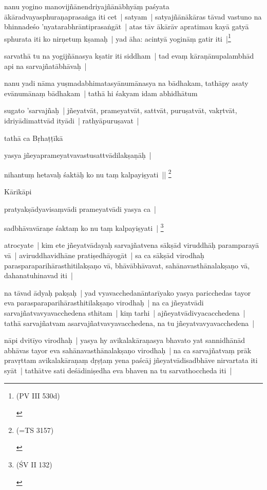 \documentclass[article,12pt,a4paper]{memoir}
\begin{document}
	  \pstart nanu yogino manovijñānendriyajñānābhyāṃ paśyata ākāradvayasphuraṇaprasaṅga iti cet | satyam | satyajñānākāras tāvad vastuno na bhinnadeśo 'nyatarabhrāntiprasaṅgāt | atas tāv ākārāv apratimau kayā gatyā sphurata iti ko nirṇetuṃ kṣamaḥ | yad āha: acintyā yogināṃ gatir iti |\footnote{\begin{english}(PV III 530d)\end{english}}
	\pend
      

	  \pstart sarvathā tu na yogijñānasya kṣatir iti siddham | tad evaṃ kāraṇānupalambhād api na sarvajñatābhāvaḥ | 
	\pend
      

	  \pstart nanu yadi nāma yuṣmadabhimatasyānumānasya na bādhakam, tathāpy asaty evānumānaṃ bādhakam | tathā hi śakyam idam abhidhātum 
	\pend
      

	  \pstart sugato 'sarvajñaḥ | jñeyatvāt, prameyatvāt, sattvāt, puruṣatvāt, vakṛtvāt, idriyādimattvād ityādi | rathyāpuruṣavat | 
	\pend
      

	  \pstart tathā ca Bṛhaṭṭīkā 
	\pend
      

	  \pstart yasya jñeyaprameyatvavastusattvādilakṣaṇāḥ | 
	\pend
      

	  \pstart nihantuṃ hetavaḥ śaktāḥ ko nu taṃ kalpayiṣyati || \footnote{\begin{english}(=TS 3157)\end{english}}
	\pend
      

	  \pstart Kārikāpi 
	\pend
      

	  \pstart pratyakṣādyavisaṃvādi prameyatvādi yasya ca | 
	\pend
      

	  \pstart sadbhāvavāraṇe śaktaṃ ko nu taṃ kalpayiṣyati | \footnote{\begin{english}(ŚV II 132)\end{english}}
	\pend
      

	  \pstart atrocyate | kim ete jñeyatvādayaḥ sarvajñatvena sākṣād viruddhāḥ paramparayā vā | aviruddhavidhāne pratiṣedhāyogāt | sa ca sākṣād virodhaḥ parasparaparihārasthitilakṣaṇo vā, bhāvābhāvavat, sahānavasthānalakṣaṇo vā, dahanatuhinavad iti | 
	\pend
      

	  \pstart na tāvad ādyaḥ pakṣaḥ | yad vyavacchedanāntarīyako yasya paricchedas tayor eva parasparaparihārasthitilakṣaṇo virodhaḥ | na ca jñeyatvādi sarvajñatvavyavacchedena sthitam | kiṃ tarhi | ajñeyatvādivyacacchedena | tathā sarvajñatvam asarvajñatvavyavacchedena, na tu jñeyatvavyavacchedena | 
	\pend
      

	  \pstart nāpi dvitīyo virodhaḥ | yasya hy avikalakāraṇasya bhavato yat sannidhānād abhāvas tayor eva sahānavasthānalakṣaṇo virodhaḥ | na ca sarvajñatvaṃ prāk pravṛttam avikalakāraṇaṃ dṛṣṭaṃ yena paścāj jñeyatvādisadbhāve nirvartata iti syāt | tathātve sati deśādiniṣedha eva bhaven na tu sarvathoccheda iti | 
	\pend
      
\end{document}
